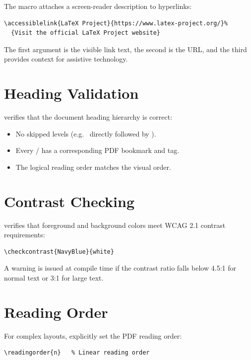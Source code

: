 The  macro attaches a screen-reader description to
hyperlinks:

\begin{verbatim}
\accessiblelink{LaTeX Project}{https://www.latex-project.org/}%
  {Visit the official LaTeX Project website}
\end{verbatim}

The first argument is the visible link text, the second is the URL, and the
third provides context for assistive technology.

\section{Heading Validation}

 verifies that the document heading hierarchy is
correct:

\begin{itemize}
  \item No skipped levels (e.g.\  directly followed by
        ).
  \item Every / has a corresponding PDF bookmark
        and tag.
  \item The logical reading order matches the visual order.
\end{itemize}

\section{Contrast Checking}

 verifies that foreground and background colors meet WCAG
2.1 contrast requirements:

\begin{verbatim}
\checkcontrast{NavyBlue}{white}
\end{verbatim}

A warning is issued at compile time if the contrast ratio falls below 4.5:1
for normal text or 3:1 for large text.

\section{Reading Order}

For complex layouts, explicitly set the PDF reading order:

\begin{verbatim}
\readingorder{n}   % Linear reading order
\end{verbatim}

